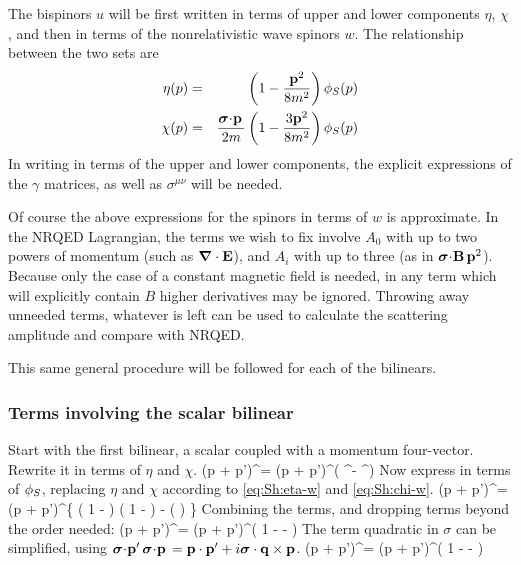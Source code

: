 The bispinors $u$ will be first written in terms of upper and lower components $\eta$, $\chi$, and then in terms of the nonrelativistic wave spinors $w$.  The relationship between the two sets are
\begin{eqnarray}
	\label{eq:Sh:eta-w} \eta(p) &=& \left( 1 - \frac{\mathbf{p}^2}{8m^2} \right ) \phi_S(p)	\\
	\label{eq:Sh:chi-w}  \chi(p)	&=& \frac{ \mbox{\boldmath$ \sigma $} \hspace{-2pt} \cdot \hspace{-2pt} \mathbf{p} \, }{2m} \left(1  - \frac{3\mathbf{p}^2}{8m^2} \right ) \phi_S(p)
\end{eqnarray}
In writing in terms of the upper and lower components,  the explicit expressions of the $\gamma$ matrices, as well as $\sigma^{\mu\nu}$ will be needed.  

Of course the above expressions for the spinors in terms of $w$ is approximate.  In the NRQED Lagrangian, the terms we wish to fix involve $A_0$ with up to two powers of momentum (such as $\mbox{\boldmath$ \nabla $} \cdot \mathbf{E}$), and $A_i$ with up to three (as in $\mbox{\boldmath$ \sigma $} \hspace{-2pt} \cdot \hspace{-2pt} \mathbf{B} \, \mathbf{p}^2$).  Because only the case of a constant magnetic field is needed, in any term which will explicitly contain $B$ higher derivatives may be ignored.  Throwing away unneeded terms, whatever is left can be used to calculate the scattering amplitude and compare with NRQED.

This same general procedure will be followed for each of the bilinears.

\subsubsection{Terms involving the scalar bilinear}
Start with the first bilinear, a scalar coupled with a momentum four-vector.  Rewrite it in terms of $\eta$ and $\chi$.
\beq
	(p + p')^\mu \srb \sr  = (p + p')^\mu \left( \eta^\dagger \eta - \chi^\dagger \chi \right ) 
\eeq
Now express in terms of $\phi_S$, replacing $\eta$ and $\chi$ according to \eqref{eq:Sh:eta-w} and \eqref{eq:Sh:chi-w}.
\beq
	(p + p')^\mu \srb \sr = (p + p')^\mu \left \{
		\wxd \left( 1 -  \right )  \left( 1 -  \right ) \wx
		- \wxd \left(   \right ) \wx \right \}
\eeq 
Combining the terms, and dropping terms beyond the order needed:
\beq
	(p + p')^\mu \srb \sr = (p + p')^\mu \wxd \left( 
		1 -   - \frac{ \gv{\sigma} \cdot \v{p'} \gv{\sigma} \cdot \v{p} }{4m^2} 
		\right ) \wx
\eeq
The term quadratic in $\sigma$ can be simplified, using $\mbox{\boldmath$ \sigma $} \hspace{-2pt} \cdot \hspace{-2pt} \mathbf{p'} \, \mbox{\boldmath$ \sigma $} \hspace{-2pt} \cdot \hspace{-2pt} \mathbf{p} \, = \mathbf{p} \cdot \mathbf{p'} + i\mbox{\boldmath$ \sigma $} \cdot \mathbf{q} \times \mathbf{p}$.
\beq \label{eq:Sh:Si}
	(p + p')^\mu \srb \sr  = (p + p')^\mu \wxd \left( 
		1 -   -  
		\right ) \wx
\eeq

